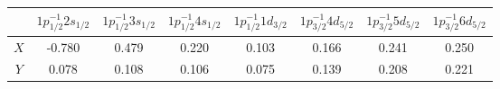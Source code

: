 \documentclass[a4paper,12pt]{book}
\numberwithin{equation}{section}
\numberwithin{figure}{section}
\numberwithin{table}{section}
\begin{document}
\begin{table}
\begin{tabular}{c|c|c|c|c|c|c|c}
		&$1p^{-1}_{1/2}2s_{1/2}$ &$1p^{-1}_{1/2}3s_{1/2}$  &$1p^{-1}_{1/2}4s_{1/2}$  &$1p^{-1}_{1/2}1d_{3/2}$  &$1p^{-1}_{3/2}4d_{5/2}$  &$1p^{-1}_{3/2}5d_{5/2}$ &$1p^{-1}_{3/2}6d_{5/2}$   \\
		\hline 
	$X$	& -0.780 &0.479  &0.220  &0.103  &0.166  &0.241  & 0.250 \\
	\hline
	$Y$	& 0.078 &0.108  &0.106  &0.075 &0.139  &0.208  & 0.221  
\end{tabular} 
\end{table}
\end{document}
